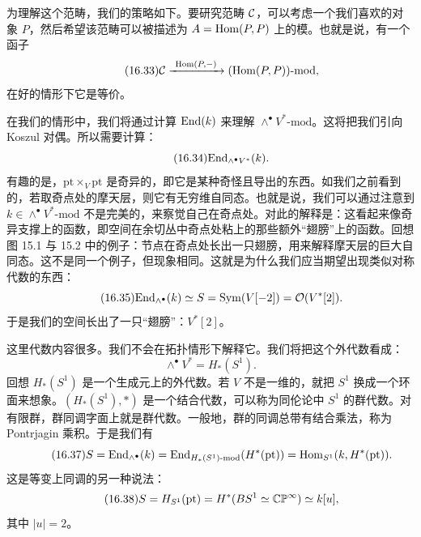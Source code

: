 为理解这个范畴，我们的策略如下。要研究范畴 $\mathcal{C}$，可以考虑一个我们喜欢的对象 $P$，然后希望该范畴可以被描述为 $A=\mathrm{Hom}(P,P)$ 上的模。也就是说，有一个函子
\begin{equation}\tag{16.33}
\mathcal{C}\xrightarrow{\ \mathrm{Hom}(P,-)\ }(\mathrm{Hom}(P,P))\text{-}\mathrm{mod},
\end{equation}
在好的情形下它是等价。

在我们的情形中，我们将通过计算 $\mathrm{End}(k)$ 来理解 $\wedge^\bullet V^*\text{-}\mathrm{mod}$。这将把我们引向 Koszul 对偶。所以需要计算：
\begin{equation}\tag{16.34}
\mathrm{End}_{\wedge^\bullet V^*}(k).
\end{equation}
有趣的是，$\mathrm{pt}\times_V\mathrm{pt}$ 是奇异的，即它是某种奇怪且导出的东西。如我们之前看到的，若取奇点处的摩天层，则它有无穷维自同态。也就是说，我们可以通过注意到 $k\in\wedge^\bullet V^*\text{-}\mathrm{mod}$ 不是完美的，来察觉自己在奇点处。对此的解释是：这看起来像奇异支撑上的函数，即空间在余切丛中奇点处粘上的那些额外“翅膀”上的函数。回想图 15.1 与 15.2 中的例子：节点在奇点处长出一只翅膀，用来解释摩天层的巨大自同态。这不是同一个例子，但现象相同。这就是为什么我们应当期望出现类似对称代数的东西：
\begin{equation}\tag{16.35}
\mathrm{End}_{\wedge^\bullet}(k)\simeq S=\mathrm{Sym}(V[-2])=\mathcal{O}(V^*[2]).
\end{equation}
于是我们的空间长出了一只“翅膀”：$V^*[2]$。%

这里代数内容很多。我们不会在拓扑情形下解释它。我们将把这个外代数看成：
\begin{equation}\tag{16.36}
\wedge^\bullet V^*=H_*(S^1).
\end{equation}
回想 $H_*(S^1)$ 是一个生成元上的外代数。若 $V$ 不是一维的，就把 $S^1$ 换成一个环面来想象。$(H_*(S^1),*)$ 是一个结合代数，可以称为同伦论中 $S^1$ 的群代数。对有限群，群同调字面上就是群代数。一般地，群的同调总带有结合乘法，称为 Pontrjagin 乘积。于是我们有
\begin{equation}\tag{16.37}
S=\mathrm{End}_{\wedge^\bullet}(k)=\mathrm{End}_{H_*(S^1)\text{-}\mathrm{mod}}(H^*(\mathrm{pt}))=\mathrm{Hom}_{S^1}(k,H^*(\mathrm{pt})).
\end{equation}
这是等变上同调的另一种说法：
\begin{equation}\tag{16.38}
S=H_{S^1}(\mathrm{pt})=H^*(BS^1\simeq\mathbb{C}\mathbb{P}^\infty)\simeq k[u],
\end{equation}
其中 $|u|=2$。

